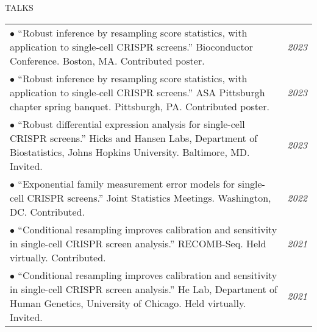 \documentclass{resume} %
\begin{document}
\begin{rSection}{TALKS}
	
	\begin{tabular}{p{14cm}R{2.5cm}}
		$\bullet$ ``Robust inference by resampling score statistics, with application to single-cell CRISPR screens.'' Bioconductor Conference. Boston, MA. Contributed poster.&\textit{2023}\\
		
		$\bullet$ ``Robust inference by resampling score statistics, with application to single-cell CRISPR screens.'' ASA Pittsburgh chapter spring
		banquet. Pittsburgh, PA. Contributed poster. & \it{2023} \\
		
		$\bullet$ ``Robust differential expression analysis for single-cell CRISPR screens.'' Hicks and Hansen Labs, Department of Biostatistics, Johns Hopkins University. Baltimore, MD. Invited. & \it{2023} \\
		
		$\bullet$ ``Exponential family measurement error models for single-cell CRISPR screens.'' Joint Statistics Meetings. Washington, DC. Contributed.  & \it{2022} \\
		
		$\bullet$  ``Conditional resampling improves calibration and sensitivity in single-cell CRISPR screen analysis.'' RECOMB-Seq. Held virtually. Contributed. & \it{2021} \\
		
		$\bullet$ ``Conditional resampling improves calibration and sensitivity in single-cell CRISPR screen analysis.'' He Lab, Department of Human Genetics, University of Chicago. Held virtually. Invited. & \it{2021}
	\end{tabular}
	
\end{rSection}

\end{document}
